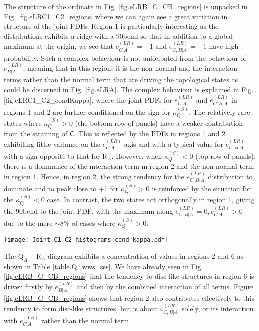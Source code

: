 \documentclass[preprint,amssymb,amsmath,aip,cha]{revtex4-1}
\begin{document}
The structure of the ordinate in Fig. \ref{fig.eLRB_C_CB_regions} is unpacked in Fig. \ref{fig.eLRC1_C2_regions} where we can again see a great variation in structure of the joint PDFs. Region 1 is particularly interesting as the distributions exhibits a ridge with a 90\degree bend so that in addition to a global maximum at the origin, we see that $e^{(LR)}_{C|A} = +1$ and $e^{(LR)}_{C,B|A} = -1$ have high probability. Such a complex behaviour is not anticipated from the behaviour of $e^{(LR)}_{B|A}$, meaning that in this region, it is the non-normal and the interaction terms rather than the normal term that are driving the topological states as could be discerned in Fig. \ref{fig.eLRA}. The complex behaviour is explained in Fig. \ref{fig.eLRC1_C2_condKappa}, where the joint PDFs for $e^{(LR)}_{C|A}$ and $e^{(LR)}_{C,B|A}$ in regions 1 and 2 are further conditioned on the sign for $\kappa_{Q}^{(S)}$. The relatively rare states where $\kappa_{Q}^{(S)} > 0$ (the bottom row of panels) have a weaker contribution from the straining of $\mathsf{C}$. This is reflected by the PDFs in regions 1 and 2 exhibiting little variance on the $e^{(LR)}_{C|A}$ axis and with a typical value for $e^{(LR)}_{C,B|A}$ with a sign opposite to that for $\mbox{R}_{A}$. However, when $\kappa_{Q}^{(S)} < 0$ (top row of panels), there is a dominance of the interaction term in region 2 and the non-normal term in region 1. Hence, in region 2, the strong tendency for the $e^{(LR)}_{C,B|A}$ distribution to dominate and to peak close to +1 for $\kappa_{Q}^{(S)} > 0$ is reinforced by the situation for the $\kappa_{Q}^{(S)} < 0$ case. In contrast, the two states act orthogonally in region 1, giving the 90\degree bend to the joint PDF, with the maximum along $e^{(LR)}_{C,B|A} = 0, e^{(LR)}_{C|A} > 0$ due to the mere $\sim 8\%$ of cases where $\kappa_{Q}^{(S)} > 0$.

\begin{figure*}
  \texttt{[image: Joint\_C1\_C2\_histograms\_cond\_kappa.pdf]}
\caption{Joint distribution functions for $e^{(LR)}_{C|A}$ and $e^{(LR)}_{C,B|A}$ using the same logarithmic scaling for the contours as adopted in Fig. \ref{fig.eLRB_C_CB} and \ref{fig.eLRC1_C2_regions}. Results are shown for regions 1 and 2 defined in Table \ref{table.Q_wws_sss} and subdivided by the sign for $\kappa_{Q}^{(S)}$.
}
\label{fig.eLRC1_C2_condKappa}        %
\end{figure*}

The $\mbox{Q}_{A}-\mbox{R}_{A}$ diagram exhibits a concentration of values in regions 2 and 6 as shown in Table \ref{table.Q_wws_sss}. We have already seen in Fig. \ref{fig.eLRB_C_CB_regions} that the tendency to disc-like structures in region 6 is driven firstly by $e^{(LR)}_{B|A}$ and then by the combined interaction of all terms. Figure \ref{fig.eLRB_C_CB_regions} shows that region 2 also contributes effectively to this tendency to form disc-like structures, but is about $e^{(LR)}_{C,B|A}$ solely, or its interaction with $e^{(LR)}_{C|A}$ rather than the normal term.
\end{document}

